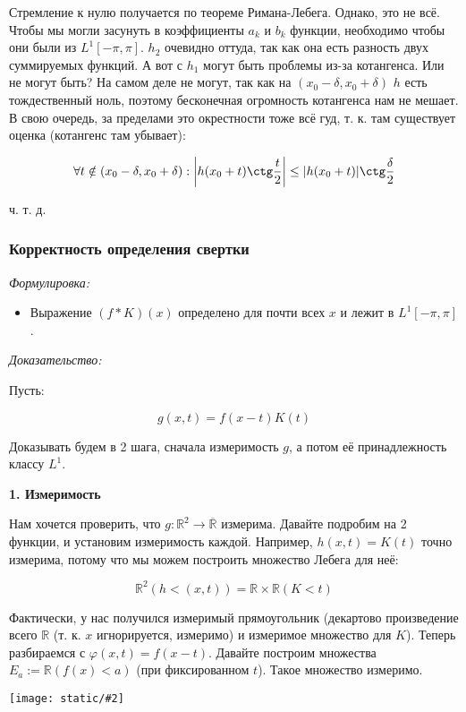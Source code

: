 \documentclass{article}
\def\images#1#2{\begin{center}\texttt{[image: static/\#2]}\end{center}}
\def\rinf{\overline{\mathbb{R}}}
\begin{document}
Стремление к нулю получается по теореме Римана-Лебега. Однако, это не всё. Чтобы мы могли засунуть в коэффициенты $a_k$ и $b_k$ функции, необходимо чтобы они были из $L^1[-\pi, \pi]$. $h_2$ очевидно оттуда, так как она есть разность двух суммируемых функций. А вот с $h_1$ могут быть проблемы из-за котангенса. Или не могут быть? На самом деле не могут, так как на $(x_0 - \delta, x_0 + \delta)$ $h$ есть тождественный ноль, поэтому бесконечная огромность котангенса нам не мешает. В свою очередь, за пределами это окрестности тоже всё гуд, т. к. там существует оценка (котангенс там убывает):

\[\forall t \notin (x_0 - \delta, x_0 + \delta): \left|h(x_0 + t)\ctg \frac{t}{2}\right| \le |h(x_0 + t)|\ctg \frac{\delta}{2}\]

ч. т. д. 


\subsubsection{Корректность определения свертки}
\textit{Формулировка:}

\begin{itemize}
    \item Выражение $(f * K)(x)$ определено для почти всех $x$ и лежит в $L^1[-\pi, \pi]$.
\end{itemize}

\textit{Доказательство:}

Пусть:

\[g(x, t) = f(x - t)K(t)\]

Доказывать будем в 2 шага, сначала измеримость $g$, а потом её принадлежность классу $L^1$.

\textbf{1. Измеримость}

Нам хочется проверить, что $g: \mathbb{R}^2 \rightarrow \rinf$ измерима. Давайте подробим на 2 функции, и установим измеримость каждой. Например, $h(x, t) = K(t)$ точно измерима, потому что мы можем построить множество Лебега для неё:

\[\mathbb{R}^2(h < (x, t)) = \mathbb{R} \times \mathbb{R}(K < t)\]

Фактически, у нас получился измеримый прямоугольник (декартово произведение всего $\mathbb{R}$ (т. к. $x$ игнорируется, измеримо) и измеримое множество для $K$). Теперь разбираемся с $\varphi(x, t) = f(x - t)$. Давайте построим множества $E_a:= \mathbb{R}(f(x) < a)$ (при фиксированном $t$). Такое множество измеримо.

\images{0.7}{korr_sv.jpg}
\end{document}
